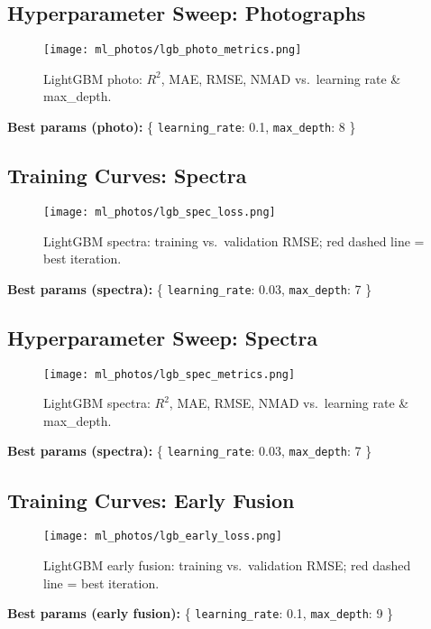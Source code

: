\documentclass[english,bachelor,oneside]{ctufit-thesis}
\begin{document}
\subsection{Hyperparameter Sweep: Photographs}
\begin{figure}[H]
  \centering
  \texttt{[image: ml\_photos/lgb\_photo\_metrics.png]}
  \caption{LightGBM photo: $R^2$, MAE, RMSE, NMAD vs.\ learning rate \& max\_depth.}
  \label{fig:lgb_photo_metrics}
\end{figure}
\noindent\textbf{Best params (photo):} \{ \texttt{learning\_rate}: 0.1, \texttt{max\_depth}: 8 \}\\

\subsection{Training Curves: Spectra}
\begin{figure}[H]
  \centering
  \texttt{[image: ml\_photos/lgb\_spec\_loss.png]}
  \caption{LightGBM spectra: training vs.\ validation RMSE; red dashed line = best iteration.}
  \label{fig:lgb_spec_loss}
\end{figure}
\noindent\textbf{Best params (spectra):} \{ \texttt{learning\_rate}: 0.03, \texttt{max\_depth}: 7 \}\\

\subsection{Hyperparameter Sweep: Spectra}
\begin{figure}[H]
  \centering
  \texttt{[image: ml\_photos/lgb\_spec\_metrics.png]}
  \caption{LightGBM spectra: $R^2$, MAE, RMSE, NMAD vs.\ learning rate \& max\_depth.}
  \label{fig:lgb_spec_metrics}
\end{figure}
\noindent\textbf{Best params (spectra):} \{ \texttt{learning\_rate}: 0.03, \texttt{max\_depth}: 7 \}\\

\subsection{Training Curves: Early Fusion}
\begin{figure}[H]
  \centering
  \texttt{[image: ml\_photos/lgb\_early\_loss.png]}
  \caption{LightGBM early fusion: training vs.\ validation RMSE; red dashed line = best iteration.}
  \label{fig:lgb_early_loss}
\end{figure}
\noindent\textbf{Best params (early fusion):} \{ \texttt{learning\_rate}: 0.1, \texttt{max\_depth}: 9 \}\\
\end{document}
